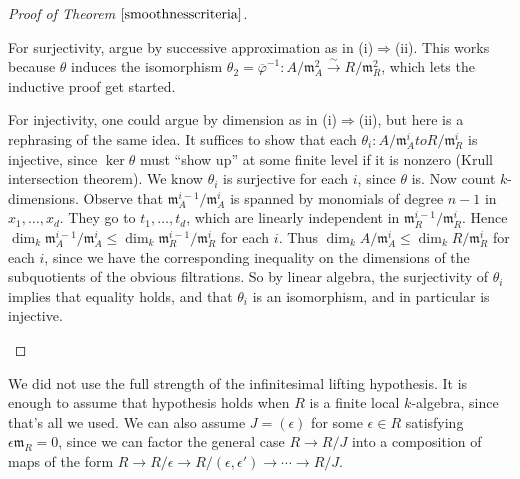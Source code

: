 \documentclass[10pt]{article}
\renewcommand{\phi}{\varphi}
\renewcommand{\(}{\left(}
\renewcommand{\)}{\right)}
\renewcommand{\bar}{\overline}
\newcommand{\m}{\backslash}
\renewcommand{\m}{\mathfrak{m}}
\numberwithin{thm}{subsection}
\begin{document}
\begin{proof}[Proof of Theorem $\ref{smoothnesscriteria}$]
\begin{itemize}
For surjectivity, argue by successive approximation as in (i)$\Rightarrow$(ii).
This works because $\theta$ induces the isomorphism $\theta_2=\bar\phi^{-1}:A/\m_A^2\stackrel{\sim}{\to}R/\m_R^2$, which lets the inductive proof get started.

For injectivity, one could argue by dimension as in (i)$\Rightarrow$(ii), but
here is a rephrasing of the same idea.
It suffices to show that each $\theta_i:A/\m_A^ito R/\m_R^i$
is injective, since $\ker\theta$ must ``show up'' at some finite level if it is nonzero (Krull intersection theorem).
We know $\theta_i$
is surjective for each $i$, since $\theta$ is.
Now count $k$-dimensions.
Observe that $\m_A^{i-1}/\m_A^i$ is spanned by monomials of degree
$n-1$ in $x_1,\ldots, x_d$.
They go to $t_1,\ldots, t_d$, which are linearly independent in 
$\m_R^{i-1}/\m_R^i$.
Hence $\dim_k\m_A^{i-1}/\m_A^i\leq \dim_k\m_R^{i-1}/\m_R^i$
for each $i$.
Thus $\dim_k A/\m_A^i\leq \dim_k R/\m_R^i$
for each $i$, since we have the corresponding inequality
on the dimensions of the subquotients
of the obvious filtrations. 
So by linear algebra, the surjectivity
of $\theta_i$ implies that equality holds,
and that $\theta_i$ is an isomorphism, and in particular
is injective.
\end{itemize}
\end{proof}
\begin{rem}\label{ILHremark}
We did not use the full strength of the infinitesimal lifting hypothesis.
It is enough to assume that hypothesis holds when $R$ is a finite local $k$-algebra, since that's all we used.
We can also assume $J=(\epsilon)$ for some $\epsilon\in R$
satisfying $\epsilon\m_R=0$,
since we can factor the general case $R\to R/J$ into a composition of 
maps of the form $R\to R/\epsilon \to R/(\epsilon,\epsilon')\to \cdots \to R/J$.
\end{rem}
\end{document}
